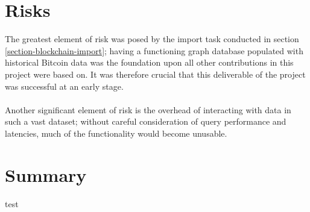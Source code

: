 \section{Risks}
The greatest element of risk was posed by the import task conducted in section \ref{section-blockchain-import}; having a functioning graph database populated with historical Bitcoin data was the foundation upon all other contributions in this project were based on. It was therefore crucial that this deliverable of the project was successful at an early stage. 
\\\\
Another significant element of risk is the overhead of interacting with data in such a vast dataset; without careful consideration of query performance and latencies, much of the functionality would become unusable. 


\section{Summary}
test




